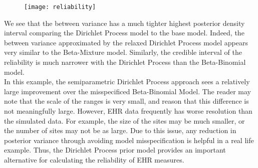 \documentclass{article}
\begin{document}
\begin{figure}[H]
\texttt{[image: reliability]}
\end{figure}

We see that the between variance has a much tighter highest posterior density interval comparing the Dirichlet Process model to the base model. Indeed, the between variance approximated by the relaxed Dirichlet Process model appears very similar to the Beta-Mixture model. Similarly, the credible interval of the reliability is much narrower with the Dirichlet Process than the Beta-Binomial model. \\

In this example, the semiparametric Dirichlet Process approach sees a relatively large improvement over the misspecificed Beta-Binomial Model. The reader may note that the scale of the ranges is very small, and reason that this difference is not meaningfully large. However, EHR data frequently has worse resolution than the simulated data. For example, the size of the sites may be much smaller, or the number of sites may not be as large. Due to this issue, any reduction in posterior variance through avoiding model misspecification is helpful in a real life example. Thus, the Dirichlet Process prior model provides an important alternative for calculating the reliability of EHR measures.


\end{document}
